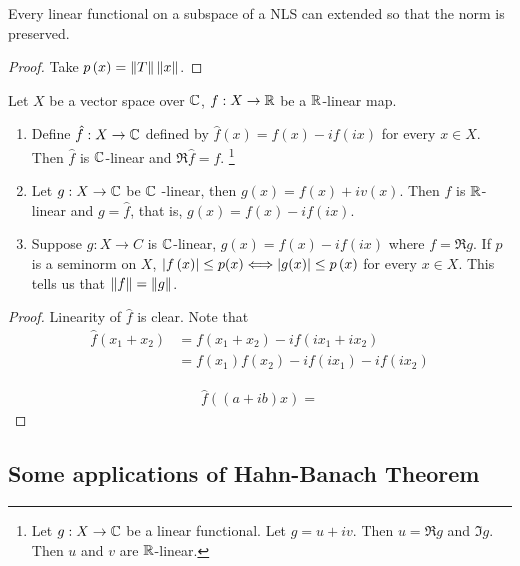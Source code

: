 \begin{corollary}
    Every linear functional on a subspace of a NLS can extended so that the norm is preserved. 
    \label{cor:continuous-extension}
\end{corollary}
\begin{proof}
    Take $p\left( x \right) = \left\lVert T \right\rVert \left\lVert x \right\rVert$. 
\end{proof}

\begin{lemma}
    Let $X$ be a vector space over $\mathbb C$, $f: X\to \mathbb R$ be a $\mathbb R$-linear map. 
    \begin{enumerate}
	\item Define $\hat{f} : X \to \mathbb C$ defined by $\hat{f} \left( x \right) = f\left( x \right) - i f\left( ix \right)$ for every $x\in X$. Then $\hat{f}$ is $\mathbb C$-linear and $\Re \hat{f} = f$. 
\footnote{Let $g : X \to \mathbb C$ be a linear functional. Let $g=u+iv$. Then $u=\Re g$ and $\Im g$. Then $u$ and $v$ are $\mathbb R$-linear.}

	\item  Let $g: X \to \mathbb C$ be $\mathbb C$ -linear, then $g(x)=f\left( x \right) + i v\left( x \right)$. Then $f$ is $\mathbb R$-linear and $g=\hat{f}$, that is, $g\left( x \right) = f\left( x \right) - i f\left( ix \right)$.

	\item Suppose $g : X\to C$ is $\mathbb C$-linear, $g(x) = f\left( x \right)- if\left( ix \right)$ where $f=\Re g$. If $p$ is a seminorm on $X$, $\left\lvert f\left( x \right) \right\rvert \le p(x) \Longleftrightarrow \left\lvert g(x) \right\rvert \le p\left( x \right) $ for every $x\in X$. This tells us that $\left\lVert f \right\rVert=\left\lVert g \right\rVert$.

    \end{enumerate}
    \label{lemma:new}
\end{lemma}
\begin{proof}
    Linearity of $\hat{f}$ is clear. Note that
    \begin{align*}
	\hat{f} \left( x_{1} + x_{2} \right) &= f\left( x_{1} + x_{2} \right) - i f\left( ix_{1} + ix_{2} \right) \\
	&=  f\left( x_{1} \right) f\left( x_{2} \right) - i f\left( ix_{1} \right) - i f \left( ix_{2} \right)
    \end{align*}

    \begin{align*}
	\hat{f} \left( (a+ib)x \right) = 
    \end{align*}
\end{proof}

\subsection{Some applications of Hahn-Banach Theorem}


